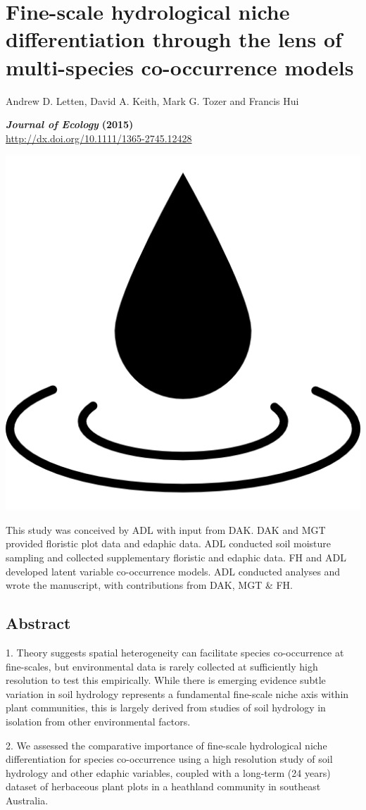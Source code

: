 

\chapter{Fine-scale hydrological niche differentiation through the lens of multi-species co-occurrence models} 

\graphicspath{{Chapter5/Figs/}}

\begin{center}

{\large Andrew D. Letten, David A. Keith, Mark G. Tozer and Francis Hui}

\small{\textit{\textbf{Journal of Ecology}} \textbf{(2015)}}\\
\url{http://dx.doi.org/10.1111/1365-2745.12428}

\vspace{1in}
\includegraphics[width=0.15\linewidth]{Chapter5/Figs/hydro}

\vfill
This study was conceived by ADL with input from DAK. DAK and MGT provided floristic plot data and edaphic data. ADL conducted soil moisture sampling and collected supplementary floristic and edaphic data. FH and ADL developed latent variable co-occurrence models. ADL conducted analyses and wrote the manuscript, with contributions from DAK, MGT \& FH. 

\end{center}
\newpage

\section{Abstract}

1. Theory suggests spatial heterogeneity can facilitate species co-occurrence at fine-scales, but environmental data is rarely collected at sufficiently high resolution to test this empirically. While there is emerging evidence subtle variation in soil hydrology represents a fundamental fine-scale niche axis within plant communities, this is largely derived from studies of soil hydrology in isolation from other environmental factors. 

2. We assessed the comparative importance of fine-scale hydrological niche differentiation for species co-occurrence using a high resolution study of soil hydrology and other edaphic variables, coupled with a long-term (24 years) dataset of herbaceous plant plots in a heathland community in southeast Australia. 

